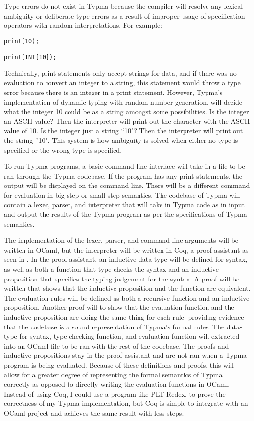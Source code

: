 \documentclass[10pt,twocolumn]{article}
\begin{document}
Type errors do not exist in Typma because
the compiler will resolve any lexical ambiguity or deliberate type errors as a result of improper usage of specification operators with random interpretations. For example:

\begin{lstlisting}
print(10);

print(INT[10]);
\end{lstlisting}

Technically, print statements only accept strings for data, and if there was no evaluation to convert an integer to a string, this statement would throw a type error because there is an integer in a print statement. However, Typma's implementation of dynamic typing with random number generation, will decide what the integer 10 could be as a string amongst some possibilities. Is the integer an ASCII value? Then the interpreter will print out
the character with the ASCII value of 10. Is the integer just a string ``10"? Then the interpreter will print out the string ``10". This system is how ambiguity is solved when either no type is specified or the wrong type is specified.

To run Typma programs, a basic command line interface will take in a file to be ran through the Typma codebase. If the program has any print statements, the output will be displayed on the command line. There will be a different command for evaluation in big step or small step semantics. The codebase of Typma will contain a lexer, parser, and interpreter that will take in Typma code as in input and output the results of the Typma program as per the specifications of Typma semantics.

The implementation of the lexer, parser, and command line arguments will be written in OCaml, but the interpreter will be written in Coq, a proof assistant as seen in \textcite{Pierce2021Software}. In the proof assistant, an inductive data-type will be defined for syntax, as well as both a function that type-checks the syntax and an inductive proposition that specifies the typing judgement for the syntax. A proof will be written that shows that the inductive proposition and the function are equivalent. The evaluation rules will be defined as both a recursive function and an inductive proposition. Another proof will to show that the evaluation function and the inductive proposition are doing the same thing for each rule, providing evidence that the codebase is a sound representation of Typma's formal rules. The data-type for syntax, type-checking function, and evaluation function will extracted into an OCaml file to be ran with the rest of the codebase. The proofs and inductive propositions stay in the proof assistant and are not ran when a Typma program is being evaluated. Because of these definitions and proofs, this will allow for a greater degree of representing the formal semantics of Typma correctly as opposed to directly writing the evaluation functions in OCaml. Instead of using Coq, I could use a program like PLT Redex, to prove the correctness of my Typma implementation, but Coq is simple to integrate with an OCaml project and achieves the same result with less steps.
\end{document}
